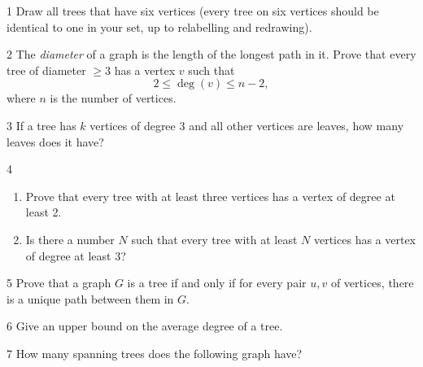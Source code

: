 
\begin{exercise}{1}
    Draw all trees that have six vertices (every tree on six vertices should be
    identical to one in your set, up to relabelling and redrawing).
\end{exercise}

\begin{exercise}{2}
    The \emph{diameter} of a graph is the length of the longest path in it.
    Prove that every tree of diameter $\ge3$ has a vertex $v$ such that
    \[
        2\le\deg(v)\le n-2,
    \]
    where $n$ is the number of vertices.
\end{exercise}

\begin{exercise}{3}
    If a tree has $k$ vertices of degree 3 and all other vertices are leaves, how
    many leaves does it have?
\end{exercise}

\begin{exercise}{4}
    \begin{enumerate}[label=(\alph*)]
        \item Prove that every tree with at least three vertices has a vertex of
              degree at least 2.
        \item Is there a number $N$ such that every tree with at least $N$
              vertices has a vertex of degree at least 3?
    \end{enumerate}
\end{exercise}

\begin{exercise}{5}
    Prove that a graph $G$ is a tree if and only if for every pair $u,v$ of
    vertices, there is a unique path between them in $G$.
\end{exercise}

\begin{exercise}{6}
    Give an upper bound on the average degree of a tree.
\end{exercise}

\begin{exercise}{7}
    How many spanning trees does the following graph have?
    \begin{center}
    \end{center}
\end{exercise}

